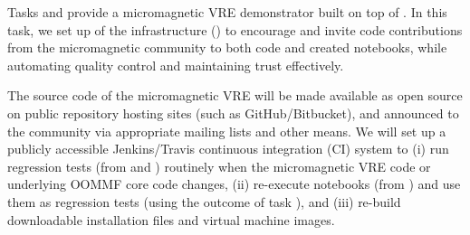 \begin{workpackage}
\begin{tasklist}
\begin{task}[id=dissemination-of-oommf-nb-virtual-environment,
  title=Open source dissemination of micromagnetic VRE,
  lead=USO,PM=4,partners={SR,USH,PS}]
  Tasks  and
   provide a micromagnetic
  VRE demonstrator built on top of \TheProject.
  In this task, we set up of the infrastructure () to encourage and
  invite code contributions from the micromagnetic community to both
  code and created notebooks, while
  automating quality control and maintaining trust effectively.

  The source code of the micromagnetic VRE will be made available as
  open source on public repository hosting sites (such as
  GitHub/Bitbucket), and announced to the community via appropriate
  mailing lists and other means. We will set up a publicly accessible
  Jenkins/Travis continuous integration (CI) system to (i) run
  regression tests (from
   and
  ) routinely when the
  micromagnetic VRE code or underlying OOMMF core code changes, (ii)
  re-execute notebooks (from
  ) and use them as
  regression tests (using the outcome of task
  ), and (iii) re-build
  downloadable installation files and virtual machine images.


\end{task}

\begin{task}[title=Micromagnetic VRE dissemination workshops,
id=dissemination-of-oommf-nb-workshops,lead=USO,PM=6]



\end{task}
\end{tasklist}
\end{workpackage}

